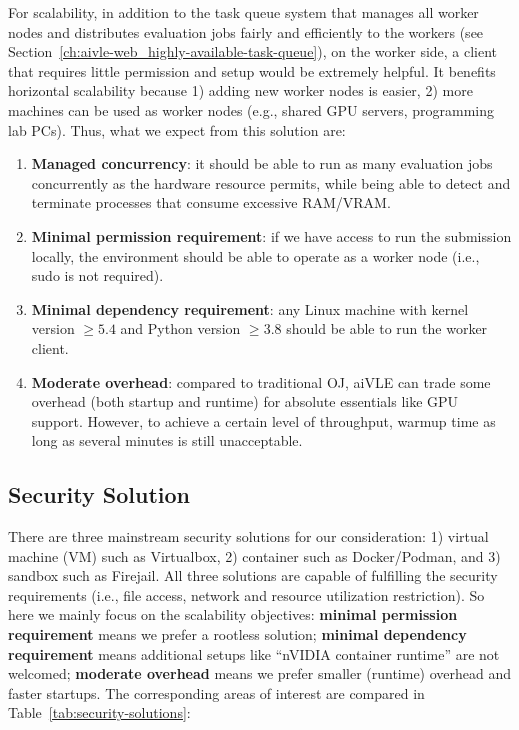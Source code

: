 For scalability, in addition to the task queue system that manages all worker nodes and distributes evaluation jobs fairly and efficiently to the workers (see Section~\ref{ch:aivle-web_highly-available-task-queue}), on the worker side, a client that requires little permission and setup would be extremely helpful. It benefits horizontal scalability because 1) adding new worker nodes is easier, 2) more machines can be used as worker nodes (e.g., shared GPU servers, programming lab PCs). Thus, what we expect from this solution are:
\begin{enumerate}
    \item \textbf{Managed concurrency}: it should be able to run as many evaluation jobs concurrently as the hardware resource permits, while being able to detect and terminate processes that consume excessive RAM/VRAM.
    \item \textbf{Minimal permission requirement}: if we have access to run the submission locally, the environment should be able to operate as a worker node (i.e., sudo is not required).
    \item \textbf{Minimal dependency requirement}: any Linux machine with kernel version $\ge 5.4$ and Python version $\ge 3.8$ should be able to run the worker client.
    \item \textbf{Moderate overhead}: compared to traditional OJ, aiVLE can trade some overhead (both startup and runtime) for absolute essentials like GPU support. However, to achieve a certain level of throughput, warmup time as long as several minutes is still unacceptable.
\end{enumerate}

\subsection{Security Solution}
There are three mainstream security solutions for our consideration: 1) virtual machine (VM) such as Virtualbox, 2) container such as Docker/Podman, and 3) sandbox such as Firejail. All three solutions are capable of fulfilling the security requirements (i.e., file access, network and resource utilization restriction). So here we mainly focus on the scalability objectives: \textbf{minimal permission requirement} means we prefer a rootless solution; \textbf{minimal dependency requirement} means additional setups like ``nVIDIA container runtime'' are not welcomed; \textbf{moderate overhead} means we prefer smaller (runtime) overhead and faster startups. The corresponding areas of interest are compared in Table~\ref{tab:security-solutions}:

